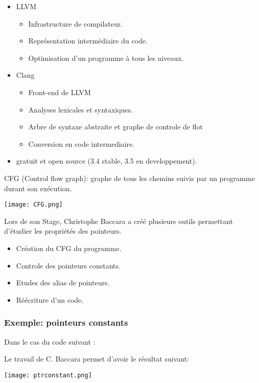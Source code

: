 \begin{frame}
  \begin{itemize}

  \item LLVM 
  \begin{itemize}
  \item Infrastructure de compilateur.
  \item Représentation intermédiaire du code.
  \item Optimisation d’un programme à tous les niveaux.
  \end{itemize}
  
  \item Clang 
  \begin{itemize}
  \item Front-end de LLVM
  \item Analyses lexicales et syntaxiques.
  \item Arbre  de syntaxe abstraite et graphe de controle de flot
  \item Conversion en code intermediaire.
  \end{itemize}
  
  \item gratuit et open source (3.4 stable, 3.5 en developpement).
  \end{itemize}
\end{frame}


\begin{frame}
	CFG (Control flow graph): graphe de tous les chemins suivis par un programme durant son exécution. 
	 \begin{center}
     \texttt{[image: CFG.png]}
  \end{center}
\end{frame}

\begin{frame}
  Lors de son Stage, Christophe Baccara a créé plusieurs outils permettant d'étudier les propriétés des pointeurs.
  \begin{itemize}
  \item Création du CFG du programme.
  \item Controle des pointeurs constants.
  \item Etudes des alias de pointeurs.
  \item Réécriture d'un code.
  \end{itemize}
\end{frame}

\begin{frame}\frametitle{Exemple: pointeurs constants}
  \label{exemple}
  Dans le cas du code suivant :
  
  Le travail de C. Baccara permet d'avoir le résultat suivant:
  \begin{center}
     \texttt{[image: ptrconstant.png]}
 \end{center}
\end{frame}



